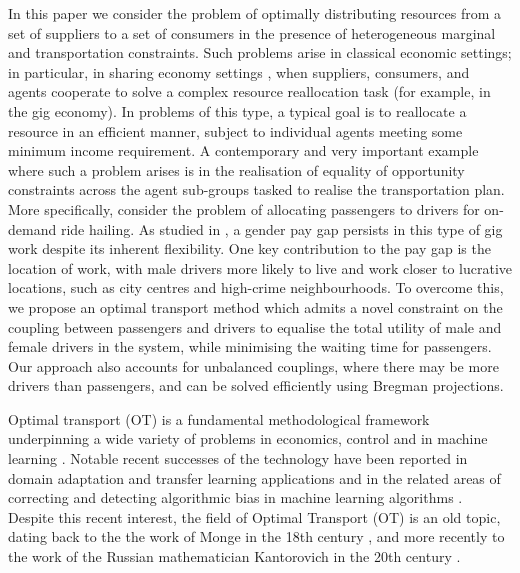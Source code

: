 \documentclass[twocolumn]{article}
\begin{document}
In this paper we consider the problem of optimally distributing resources from a set of suppliers to a set of consumers in the presence of heterogeneous marginal and transportation constraints. Such problems arise in classical economic settings; in particular, in sharing economy settings \cite{shorten}, when suppliers, consumers, and agents cooperate to solve a complex resource reallocation task (for example, in the gig economy). In problems of this type, a typical goal is to reallocate a resource in an efficient manner, subject to individual agents meeting some minimum income requirement. A contemporary and very important example where such a problem arises is in the realisation of equality of opportunity constraints across the agent sub-groups tasked to realise the transportation plan. More specifically, consider the problem of allocating passengers to drivers for on-demand ride hailing. As studied in \cite{cook2021gender}, a gender pay gap persists in this type of gig work despite its inherent flexibility. One key contribution to the pay gap is the location of work, with male drivers more likely to live and work closer to lucrative locations, such as city centres and high-crime neighbourhoods. To overcome this, we propose an optimal transport method which admits a novel constraint on the coupling between passengers and drivers to equalise the total utility of male and female drivers in the system, while minimising the waiting time for passengers. Our approach also accounts for unbalanced couplings, where there may be more drivers than passengers, and can be solved efficiently using Bregman projections.

Optimal transport (OT) is a fundamental methodological framework underpinning a wide variety of problems in economics, control and in machine learning \cite{gal,gan2023optimal,montesuma2024recent}. 
Notable recent successes of the technology have been reported in domain adaptation and transfer learning applications \cite{pey,kolkin2019style,peterson2021transfer}
and in the related areas of correcting and detecting algorithmic bias in machine learning algorithms \cite{gor,abi,quan}. Despite this recent interest, the field of Optimal Transport (OT) is an old topic, dating back to the the work of Monge in the 18th century \cite{monge1781memoire}, and more recently to the work of the Russian mathematician Kantorovich in the 20th century \cite{kantorovich1942translocation}.
\end{document}

